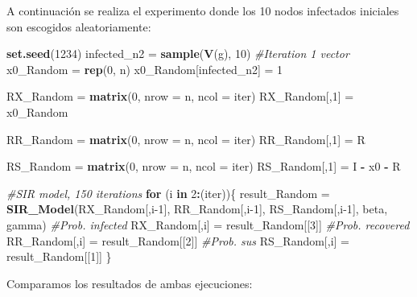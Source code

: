\documentclass[
]{article}
\newenvironment{Shaded}{\begin{snugshade}}{\end{snugshade}}
\newcommand{\CommentTok}[1]{\textcolor[rgb]{0.56,0.35,0.01}{\textit{#1}}}
\newcommand{\ControlFlowTok}[1]{\textcolor[rgb]{0.13,0.29,0.53}{\textbf{#1}}}
\newcommand{\DataTypeTok}[1]{\textcolor[rgb]{0.13,0.29,0.53}{#1}}
\newcommand{\DecValTok}[1]{\textcolor[rgb]{0.00,0.00,0.81}{#1}}
\newcommand{\KeywordTok}[1]{\textcolor[rgb]{0.13,0.29,0.53}{\textbf{#1}}}
\newcommand{\NormalTok}[1]{#1}
\newcommand{\OperatorTok}[1]{\textcolor[rgb]{0.81,0.36,0.00}{\textbf{#1}}}
\newcommand{\StringTok}[1]{\textcolor[rgb]{0.31,0.60,0.02}{#1}}
\begin{document}
A continuación se realiza el experimento donde los 10 nodos infectados
iniciales son escogidos aleatoriamente:

\begin{Shaded}
\begin{Highlighting}[]
\KeywordTok{set.seed}\NormalTok{(}\DecValTok{1234}\NormalTok{)}
\NormalTok{infected_n2 =}\StringTok{ }\KeywordTok{sample}\NormalTok{(}\KeywordTok{V}\NormalTok{(g), }\DecValTok{10}\NormalTok{)}
\CommentTok{#Iteration 1 vector}
\NormalTok{x0_Random =}\StringTok{ }\KeywordTok{rep}\NormalTok{(}\DecValTok{0}\NormalTok{, n)}
\NormalTok{x0_Random[infected_n2] =}\StringTok{ }\DecValTok{1}

\NormalTok{RX_Random =}\StringTok{ }\KeywordTok{matrix}\NormalTok{(}\DecValTok{0}\NormalTok{, }\DataTypeTok{nrow =}\NormalTok{ n, }\DataTypeTok{ncol =}\NormalTok{ iter)}
\NormalTok{RX_Random[,}\DecValTok{1}\NormalTok{] =}\StringTok{ }\NormalTok{x0_Random}

\NormalTok{RR_Random =}\StringTok{ }\KeywordTok{matrix}\NormalTok{(}\DecValTok{0}\NormalTok{, }\DataTypeTok{nrow =}\NormalTok{ n, }\DataTypeTok{ncol =}\NormalTok{ iter)}
\NormalTok{RR_Random[,}\DecValTok{1}\NormalTok{] =}\StringTok{ }\NormalTok{R}

\NormalTok{RS_Random =}\StringTok{ }\KeywordTok{matrix}\NormalTok{(}\DecValTok{0}\NormalTok{, }\DataTypeTok{nrow =}\NormalTok{ n, }\DataTypeTok{ncol =}\NormalTok{ iter)}
\NormalTok{RS_Random[,}\DecValTok{1}\NormalTok{] =}\StringTok{ }\NormalTok{I }\OperatorTok{-}\StringTok{ }\NormalTok{x0 }\OperatorTok{-}\StringTok{ }\NormalTok{R }

\CommentTok{#SIR model, 150 iterations}
\ControlFlowTok{for}\NormalTok{ (i }\ControlFlowTok{in} \DecValTok{2}\OperatorTok{:}\NormalTok{(iter))\{}
\NormalTok{  result_Random =}\StringTok{ }\KeywordTok{SIR_Model}\NormalTok{(RX_Random[,i}\DecValTok{-1}\NormalTok{], RR_Random[,i}\DecValTok{-1}\NormalTok{], RS_Random[,i}\DecValTok{-1}\NormalTok{], beta, gamma)}
  \CommentTok{#Prob. infected}
\NormalTok{  RX_Random[,i] =}\StringTok{ }\NormalTok{result_Random[[}\DecValTok{3}\NormalTok{]]}
  \CommentTok{#Prob. recovered}
\NormalTok{  RR_Random[,i] =}\StringTok{ }\NormalTok{result_Random[[}\DecValTok{2}\NormalTok{]]}
  \CommentTok{#Prob. sus}
\NormalTok{  RS_Random[,i] =}\StringTok{ }\NormalTok{result_Random[[}\DecValTok{1}\NormalTok{]]}
\NormalTok{\}}
\end{Highlighting}
\end{Shaded}

Comparamos los resultados de ambas ejecuciones:
\end{document}
